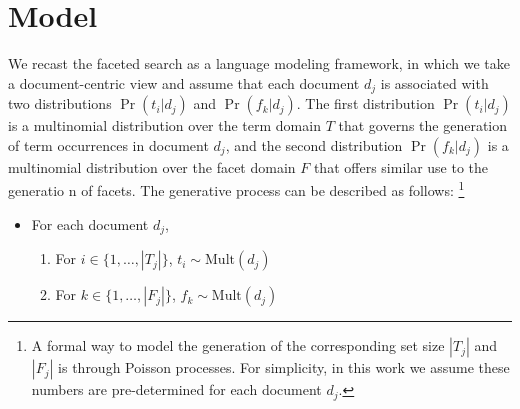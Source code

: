 % 
% 
% 

\section{Model}


We recast the faceted search as a language modeling framework, in which we take
a document-centric view and assume that each document $d_j$ is associated with
two distributions $\Pr(t_i|d_j)$ and $\Pr(f_k|d_j)$.  The first distribution
$\Pr(t_i|d_j)$ is a multinomial distribution over the term domain $T$ that
governs the generation of term occurrences in document $d_j$, and the second
distribution $\Pr(f_k|d_j)$ is a multinomial distribution over the facet domain
$F$ that offers similar use to the generatio n of facets.  The generative
process can be described as follows: \footnote{A formal way to model the
generation of the corresponding set size $|T_j|$ and $|F_j|$ is through Poisson
processes.  For simplicity, in this work we assume these numbers are
pre-determined for each document $d_j$.} 

\begin{itemize} \item For each document $d_j$, \begin{enumerate} \item For $i
\in \{ 1, \ldots, |T_j| \}$, $t_i \sim \textrm{Mult}(d_j)$ \item For $k \in \{
  1, \ldots, |F_j| \}$, $f_k \sim \textrm{Mult}(d_j)$ \end{enumerate}
  \end{itemize}

